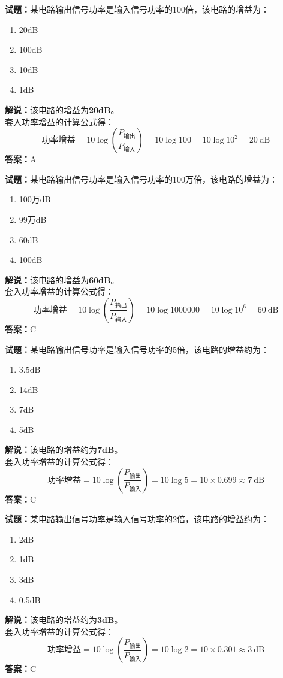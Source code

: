 \documentclass{ctexbook}
\begin{document}
\bigskip

\noindent\textbf{试题：}某电路输出信号功率是输入信号功率的100倍，该电路的增益为：
\begin{enumerate}[leftmargin=3em]
  \item 20dB
  \item 100dB
  \item 10dB
  \item 1dB
\end{enumerate}
\noindent\textbf{解说：}该电路的增益为\textbf{20dB}。\\
套入功率增益的计算公式得：
$$\mbox{功率增益}=10 \log \left( {\frac{P_{ \mbox{输出} }}{P_{ \mbox{输入} }}} \right)=10 \log 100 = 10 \log 10^2 = 20 \ \mathrm{dB}$$
\noindent\textbf{答案：}A

\bigskip

\noindent\textbf{试题：}某电路输出信号功率是输入信号功率的100万倍，该电路的增益为：
\begin{enumerate}[leftmargin=3em]
  \item 100万dB
  \item 99万dB
  \item 60dB
  \item 100dB
\end{enumerate}
\noindent\textbf{解说：}该电路的增益为\textbf{60dB}。\\
套入功率增益的计算公式得：
$$\mbox{功率增益}=10 \log \left( {\frac{P_{ \mbox{输出} }}{P_{ \mbox{输入} }}} \right)=10 \log 1000000 = 10 \log 10^6 = 60 \ \mathrm{dB}$$
\noindent\textbf{答案：}C

\bigskip

\noindent\textbf{试题：}某电路输出信号功率是输入信号功率的5倍，该电路的增益约为：
\begin{enumerate}[leftmargin=3em]
  \item 3.5dB
  \item 14dB
  \item 7dB
  \item 5dB
\end{enumerate}
\noindent\textbf{解说：}该电路的增益约为\textbf{7dB}。\\
套入功率增益的计算公式得：
$$\mbox{功率增益}=10 \log \left( {\frac{P_{ \mbox{输出} }}{P_{ \mbox{输入} }}} \right)=10 \log 5 = 10 \times 0.699 \approx 7 \ \mathrm{dB}$$
\noindent\textbf{答案：}C

\bigskip

\noindent\textbf{试题：}某电路输出信号功率是输入信号功率的2倍，该电路的增益约为：
\begin{enumerate}[leftmargin=3em]
  \item 2dB
  \item 1dB
  \item 3dB
  \item 0.5dB
\end{enumerate}
\noindent\textbf{解说：}该电路的增益约为\textbf{3dB}。\\
套入功率增益的计算公式得：
$$\mbox{功率增益}=10 \log \left( {\frac{P_{ \mbox{输出} }}{P_{ \mbox{输入} }}} \right)=10 \log 2 = 10 \times 0.301 \approx 3 \ \mathrm{dB}$$
\noindent\textbf{答案：}C
\end{document}
